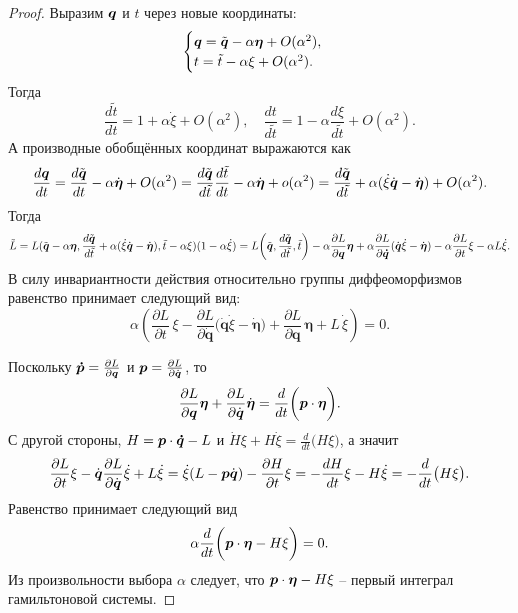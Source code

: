 \begin{proof}
    Выразим $\boldsymbol{q}$ и $t$ через новые координаты:
    \[
        \begin{cases}
            \boldsymbol{q} = \tilde{\boldsymbol{q}} - \alpha \boldsymbol{\eta} + O(\alpha^2), \\
            t = \tilde{t} - \alpha \xi + O(\alpha^2).
        \end{cases}
    \]
    Тогда
    \[
        \dfrac{d \tilde{t}}{dt} = 1 + \alpha \dot{\xi} + O(\alpha^2), \quad \dfrac{d t}{d \tilde{t}} = 1 - \alpha \dfrac{d \xi}{d \tilde{t}} + O(\alpha^2).
    \]
    А производные обобщённых координат выражаются как
    \[
        \dfrac{d \boldsymbol{q}}{dt} = \dfrac{d \tilde{\boldsymbol{q}}}{dt} - \alpha \dot{\boldsymbol{\eta}} + O(\alpha^2) = \dfrac{d \tilde{\boldsymbol{q}}}{d\tilde{t}} \dfrac{d \tilde{t}}{dt} - \alpha \dot{\boldsymbol{\eta}} + o (\alpha^2) = \dfrac{d \tilde{\boldsymbol{q}}}{d \tilde{t}} + \alpha (\dot{\xi} \dot{\boldsymbol{q}} - \dot{\boldsymbol{\eta}}) + O(\alpha^2).
    \]
    Тогда
    \[
        \tilde{L} = L(\tilde{\boldsymbol{q}} - \alpha \boldsymbol{\eta}, \dfrac{d\tilde{\boldsymbol{q}}}{d\tilde{t}} + \alpha(\dot{\xi}\dot{\boldsymbol{q}} - \dot{\boldsymbol{\eta}}), \tilde{t} - \alpha \xi)(1 - \alpha \dot{\xi}) =
        L\biggr(\tilde{\boldsymbol{q}}, \frac{d \tilde{\boldsymbol{q}}}{d \tilde{t}}, \tilde{t}\biggr) - \alpha \dfrac{\partial L}{\partial \boldsymbol{q}} \boldsymbol{\eta} + \alpha \dfrac{\partial L}{\partial \boldsymbol{\dot{q}}}(\dot{\boldsymbol{q}}\dot{\xi} - \dot{\boldsymbol{\eta}}) - \alpha \dfrac{\partial L}{\partial t} \xi - \alpha L \dot{\xi}.
    \]
    В силу инвариантности действия относительно группы диффеоморфизмов равенство принимает следующий вид:
\[
  \alpha\!\left(
    \frac{\partial L}{\partial t}\,\xi
    - \frac{\partial L}{\partial \dot{\mathbf{q}}}\bigl(\dot{\mathbf{q}}\dot{\xi}-\dot{\boldsymbol{\eta}}\bigr)
    + \frac{\partial L}{\partial \mathbf{q}}\,\boldsymbol{\eta}
    + L\,\dot{\xi}
  \right) = 0.
\]

    Поскольку $\boldsymbol{\dot{p}} = \frac{\partial L}{\partial \boldsymbol{q}}$ и $\boldsymbol{p} = \frac{\partial L}{\partial \dot{\boldsymbol{q}}}$, то
    \[
        \dfrac{\partial L}{\partial \boldsymbol{q}} \boldsymbol{\eta} + \dfrac{\partial L}{\partial \dot{\boldsymbol{q}}} \dot{\boldsymbol{\eta}} = \dfrac{d}{dt}\biggr(\boldsymbol{p} \cdot \boldsymbol{\eta}\biggr).
    \]
    С другой стороны, $H = \boldsymbol{p} \cdot \boldsymbol{\dot{q}} - L$ и $\dot{H}\xi + H \dot{\xi} = \frac{d}{dt}\big(H \xi \big)$, а значит
    \[
        \dfrac{\partial L}{\partial t}\xi - \dot{\boldsymbol{q}}\dfrac{\partial L}{\partial \dot{\boldsymbol{q}}}\dot{\xi} + L \dot{\xi} = \dot{\xi}(L - \boldsymbol{p}\dot{\boldsymbol{q}}) - \dfrac{\partial H}{\partial t}\xi = - \dfrac{dH}{dt}\xi - H\dot{\xi} = -\dfrac{d}{dt}\big(H \xi\big).
    \]
    Равенство принимает следующий вид
    \[
        \alpha \dfrac{d}{dt}\biggr( \boldsymbol{p} \cdot \boldsymbol{\eta} - H \xi \biggr) = 0.
    \]
    Из произвольности выбора $\alpha$ следует, что $\boldsymbol{p} \cdot \boldsymbol{\eta} - H \xi$ -- первый интеграл гамильтоновой системы.
\end{proof}
